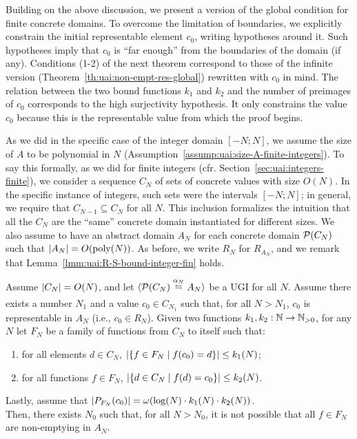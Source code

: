 Building on the above discussion, we present a version of the global condition for finite concrete domains. To overcome the limitation of boundaries, we explicitly constrain the initial representable element $c_0$, writing hypotheses around it. Such hypotheses imply that $c_0$ is ``far enough'' from the boundaries of the domain (if any).
Conditions (1-2) of the next theorem correspond to those of the infinite version (Theorem~\ref{th:uai:non-empt-res-global}) rewritten with $c_0$ in mind. The relation between the two bound functions $k_1$ and $k_2$ and the number of preimages of $c_0$ corresponds to the high surjectivity hypothesis. It only constrains the value $c_0$ because this is the representable value from which the proof begins.

As we did in the specific case of the integer domain $[-N; N]$, we assume the size of $A$ to be polynomial in $N$ (Assumption~\ref{assump:uai:size-A-finite-integers}). To say this formally, as we did for finite integers (cfr. Section~\ref{sec:uai:integers-finite}), we consider a sequence $C_N$ of sets of concrete values with size $O(N)$. In the specific instance of integers, such sets were the intervals $[-N; N]$; in general, we require that $C_{N-1} \subseteq C_N$ for all $N$. This inclusion formalizes the intuition that all the $C_N$ are the ``same'' concrete domain instantiated for different sizes.
We also assume to have an abstract domain $A_N$ for each concrete domain $\mathcal{P}(C_N)$ such that $\lvert A_N\rvert = O(\text{poly}(N))$. As before, we write $R_N$ for $R_{A_N}$, and we remark that Lemma~\ref{lmm:uai:R-S-bound-integer-fin} holds.

\begin{theorem}\label{th:uai:non-empt-res-finite-global}
	Assume $\lvert C_N\rvert = O(N)$, and let $\ugi{\pow(C_N)}{\alpha_N}{A_N}$ be a UGI for all $N$.
	Assume there exists a number $N_1$ and a value $c_0 \in C_{N_1}$ such that, for all $N > N_1$, $c_0$ is representable in $A_N$ (i.e., $c_0 \in R_{N}$).
	Given  two functions $k_1, k_2 : \mathbb{N} \rightarrow \mathbb{N}_{>0}$, for any $N$
	let $F_N$ be a family of functions from $C_N$ to itself such that:
	\begin{enumerate}
		\item for all elements $d \in C_N$, $\lvert\{f \in F_N \mid f(c_0) = d \}\rvert \leq k_1(N)$;
		\item for all functions $f \in F_N$, $\lvert\{d \in C_N \mid f(d) = c_0\}\rvert \leq k_2(N)$.
	\end{enumerate}
	Lastly, assume that $\lvert P_{F_N}(c_0)\rvert = \omega(\log(N) \cdot k_1(N) \cdot k_2(N))$.\\
	Then, there exists $N_0$ such that, for all $N > N_0$, it is not possible that all $f \in F_N$ are non-emptying in $A_N$.
\end{theorem}

